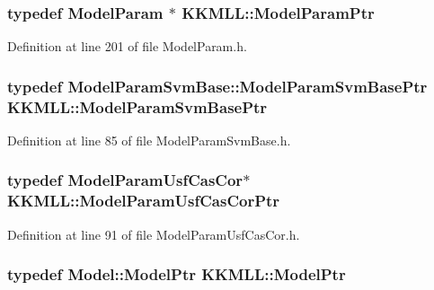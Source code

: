\subsubsection[{\texorpdfstring{Model\+Param\+Ptr}{ModelParamPtr}}]{\setlength{\rightskip}{0pt plus 5cm}typedef {\bf Model\+Param} $\ast$ {\bf K\+K\+M\+L\+L\+::\+Model\+Param\+Ptr}}\hypertarget{namespace_k_k_m_l_l_a76c2dec3304f1a2dc2e357872e4fb320}{}\label{namespace_k_k_m_l_l_a76c2dec3304f1a2dc2e357872e4fb320}


Definition at line 201 of file Model\+Param.\+h.

\subsubsection[{\texorpdfstring{Model\+Param\+Svm\+Base\+Ptr}{ModelParamSvmBasePtr}}]{\setlength{\rightskip}{0pt plus 5cm}typedef {\bf Model\+Param\+Svm\+Base\+::\+Model\+Param\+Svm\+Base\+Ptr} {\bf K\+K\+M\+L\+L\+::\+Model\+Param\+Svm\+Base\+Ptr}}\hypertarget{namespace_k_k_m_l_l_a33c6027f2904ad96488db149ac30500c}{}\label{namespace_k_k_m_l_l_a33c6027f2904ad96488db149ac30500c}


Definition at line 85 of file Model\+Param\+Svm\+Base.\+h.

\subsubsection[{\texorpdfstring{Model\+Param\+Usf\+Cas\+Cor\+Ptr}{ModelParamUsfCasCorPtr}}]{\setlength{\rightskip}{0pt plus 5cm}typedef {\bf Model\+Param\+Usf\+Cas\+Cor}$\ast$ {\bf K\+K\+M\+L\+L\+::\+Model\+Param\+Usf\+Cas\+Cor\+Ptr}}\hypertarget{namespace_k_k_m_l_l_aa344d19d8e93c3923eb2c82bc999e9c5}{}\label{namespace_k_k_m_l_l_aa344d19d8e93c3923eb2c82bc999e9c5}


Definition at line 91 of file Model\+Param\+Usf\+Cas\+Cor.\+h.

\subsubsection[{\texorpdfstring{Model\+Ptr}{ModelPtr}}]{\setlength{\rightskip}{0pt plus 5cm}typedef {\bf Model\+::\+Model\+Ptr} {\bf K\+K\+M\+L\+L\+::\+Model\+Ptr}}\hypertarget{namespace_k_k_m_l_l_a5e593621576d583bef55408bd6a3cfd5}{}\label{namespace_k_k_m_l_l_a5e593621576d583bef55408bd6a3cfd5}


